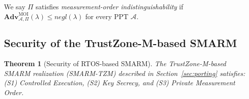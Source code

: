 \documentclass{ieeeaccess}
\newcommand{\smarm}{SMARM\xspace}
\newtheorem{theorem}{Theorem}[section]
\newcommand{\Adv}{\mathbf{Adv}}
\begin{document}
We say $\Pi$ satisfies \emph{measurement-order indistinguishability} if
$\Adv^{\mathrm{MOI}}_{\mathcal{A},\Pi}(\lambda) \leq \mathit{negl}(\lambda)$
for every PPT $\mathcal{A}$.
 
\subsection{Security of the TrustZone-M-based \smarm}
\label{sec:tzm-security}

\begin{theorem}[Security of RTOS-based SMARM]
\label{thm:tzm}
The TrustZone-M-based SMARM realization (SMARM-TZM) described in Section~\ref{sec:porting} satisfies: (S1) Controlled Execution,
(S2) Key Secrecy, and (S3) Private Measurement Order.
\end{theorem}
\end{document}
